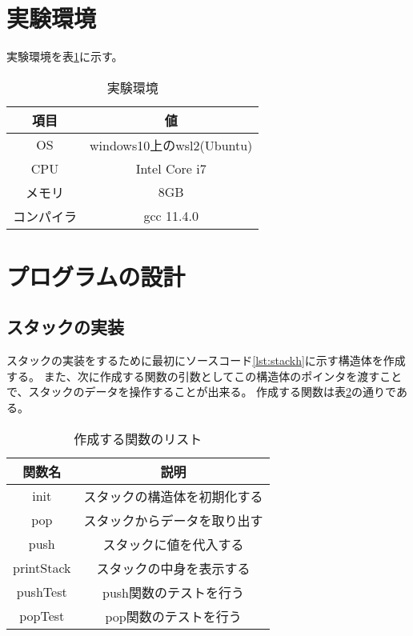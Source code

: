 \documentclass[a4paper,11pt]{jsarticle}
\begin{document}
\section{実験環境}
実験環境を表\ref{tab:environment}に示す。
\begin{table}[ht]
  \centering
  \begin{tabular}{|c|c|}
    \hline
    \textbf{項目} & \textbf{値}              \\
    \hline
    OS          & windows10上のwsl2(Ubuntu) \\
    \hline
    CPU         & Intel Core i7           \\
    \hline
    メモリ         & 8GB                     \\
    \hline
    コンパイラ       & gcc 11.4.0              \\
    \hline
  \end{tabular}
  \caption{実験環境}
  \label{tab:environment}
\end{table}
\newpage
\section{プログラムの設計}
\subsection{スタックの実装}
スタックの実装をするために最初にソースコード\ref{lst:stackh}に示す構造体を作成する。
また、次に作成する関数の引数としてこの構造体のポインタを渡すことで、スタックのデータを操作することが出来る。
作成する関数は表\ref{tab:functions}の通りである。
\begin{table}[ht]
  \centering
  \begin{tabular}{|c|c|}
    \hline
    \textbf{関数名} & \textbf{説明}    \\
    \hline
    init         & スタックの構造体を初期化する \\
    \hline
    pop          & スタックからデータを取り出す \\
    \hline
    push         & スタックに値を代入する    \\
    \hline
    printStack   & スタックの中身を表示する   \\
    \hline
    pushTest     & push関数のテストを行う  \\
    \hline
    popTest      & pop関数のテストを行う   \\
    \hline
  \end{tabular}
  \caption{作成する関数のリスト}
  \label{tab:functions}
\end{table}
\end{document}
